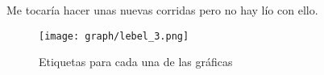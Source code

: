 %
%    
%
%
%


Me tocaría hacer unas nuevas corridas pero no hay lío con ello.
\begin{figure}
    \centering
    \texttt{[image: graph/lebel\_3.png]}
    \caption{Etiquetas para cada una de las gráficas}
    \label{fig:my_label}
\end{figure}